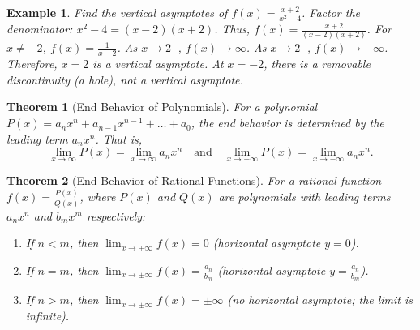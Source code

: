 \documentclass[11pt,a4paper]{article}
\newtheorem{example}{Example}
\newtheorem{theorem}{Theorem}
\begin{document}
\begin{example}
Find the vertical asymptotes of $f(x) = \frac{x + 2}{x^2 - 4}$.
Factor the denominator: $x^2 - 4 = (x - 2)(x + 2)$. Thus, $f(x) = \frac{x + 2}{(x - 2)(x + 2)}$.
For $x \neq -2$, $f(x) = \frac{1}{x - 2}$.
As $x \to 2^+$, $f(x) \to \infty$. As $x \to 2^-$, $f(x) \to -\infty$.
Therefore, $x = 2$ is a vertical asymptote. At $x = -2$, there is a removable discontinuity (a hole), not a vertical asymptote.
\end{example}
\begin{theorem}[End Behavior of Polynomials]
For a polynomial $P(x) = a_n x^n + a_{n-1} x^{n-1} + \dots + a_0$, the end behavior is determined by the leading term $a_n x^n$. That is,
\[
\lim_{x \to \infty} P(x) = \lim_{x \to \infty} a_n x^n \quad \text{and} \quad \lim_{x \to -\infty} P(x) = \lim_{x \to -\infty} a_n x^n.
\]
\end{theorem}
\begin{theorem}[End Behavior of Rational Functions]
For a rational function $f(x) = \frac{P(x)}{Q(x)}$, where $P(x)$ and $Q(x)$ are polynomials with leading terms $a_n x^n$ and $b_m x^m$ respectively:
\begin{enumerate}
\item If $n < m$, then $\displaystyle \lim_{x \to \pm\infty} f(x) = 0$ (horizontal asymptote $y = 0$).
\item If $n = m$, then $\displaystyle \lim_{x \to \pm\infty} f(x) = \frac{a_n}{b_m}$ (horizontal asymptote $y = \frac{a_n}{b_m}$).
\item If $n > m$, then $\displaystyle \lim_{x \to \pm\infty} f(x) = \pm\infty$ (no horizontal asymptote; the limit is infinite).
\end{enumerate}
\end{theorem}
\end{document}
